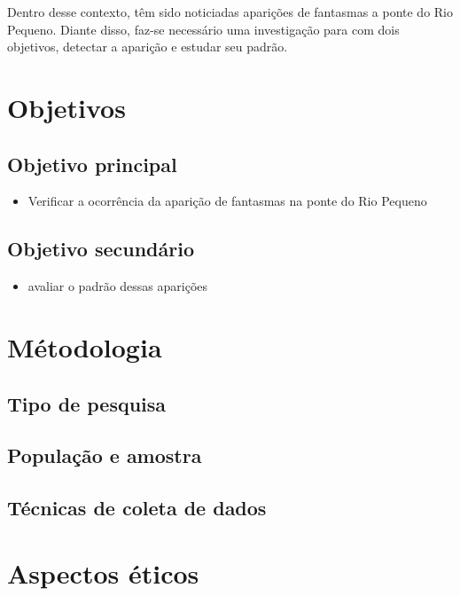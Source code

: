 \documentclass[]{abntex2}
\providecommand{\tightlist}{%
  \setlength{\itemsep}{0pt}\setlength{\parskip}{0pt}}
\begin{document}
Dentro desse contexto, têm sido noticiadas aparições de fantasmas a ponte do Rio Pequeno. Diante disso, faz-se necessário uma investigação para com dois objetivos, detectar a aparição e estudar seu padrão.

\hypertarget{objetivos}{%
\chapter{Objetivos}\label{objetivos}}

\hypertarget{objetivo-principal}{%
\section{Objetivo principal}\label{objetivo-principal}}

\begin{itemize}
\tightlist
\item
  Verificar a ocorrência da aparição de fantasmas na ponte do Rio Pequeno
\end{itemize}

\hypertarget{objetivo-secundario}{%
\section{Objetivo secundário}\label{objetivo-secundario}}

\begin{itemize}
\tightlist
\item
  avaliar o padrão dessas aparições
\end{itemize}

\hypertarget{metodologia}{%
\chapter{Métodologia}\label{metodologia}}

\hypertarget{tipo-de-pesquisa}{%
\section{Tipo de pesquisa}\label{tipo-de-pesquisa}}

\hypertarget{populacao-e-amostra}{%
\section{População e amostra}\label{populacao-e-amostra}}

\hypertarget{tecnicas-de-coleta-de-dados}{%
\section{Técnicas de coleta de dados}\label{tecnicas-de-coleta-de-dados}}

\hypertarget{aspectos-eticos}{%
\chapter{Aspectos éticos}\label{aspectos-eticos}}

\printbibliography[title=Referências bibliográficas]
\end{document}
